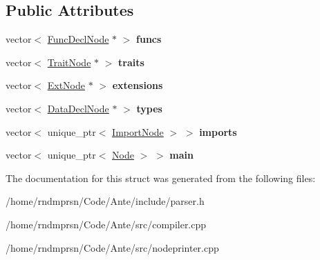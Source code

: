 \subsection*{Public Attributes}
\begin{DoxyCompactItemize}
\item 
\mbox{\label{structRootNode_a19febba060ea41f0c58644d57961dec1}} 
vector$<$ \hyperlink{structFuncDeclNode}{Func\+Decl\+Node} $\ast$ $>$ {\bfseries funcs}
\item 
\mbox{\label{structRootNode_a117ef77726fd5f3c3e4ead6abad58dc9}} 
vector$<$ \hyperlink{structTraitNode}{Trait\+Node} $\ast$ $>$ {\bfseries traits}
\item 
\mbox{\label{structRootNode_aabc83f42e419bcb09678aa661256b3e4}} 
vector$<$ \hyperlink{structExtNode}{Ext\+Node} $\ast$ $>$ {\bfseries extensions}
\item 
\mbox{\label{structRootNode_a4fec05675e4a7ecee8beabfb4801e2aa}} 
vector$<$ \hyperlink{structDataDeclNode}{Data\+Decl\+Node} $\ast$ $>$ {\bfseries types}
\item 
\mbox{\label{structRootNode_ab814cb1540c7ff388c0587f218b984b2}} 
vector$<$ unique\+\_\+ptr$<$ \hyperlink{structImportNode}{Import\+Node} $>$ $>$ {\bfseries imports}
\item 
\mbox{\label{structRootNode_afe384fca3477b96b61f6379733a96902}} 
vector$<$ unique\+\_\+ptr$<$ \hyperlink{structNode}{Node} $>$ $>$ {\bfseries main}
\end{DoxyCompactItemize}


The documentation for this struct was generated from the following files\+:\begin{DoxyCompactItemize}
\item 
/home/rndmprsn/\+Code/\+Ante/include/parser.\+h\item 
/home/rndmprsn/\+Code/\+Ante/src/compiler.\+cpp\item 
/home/rndmprsn/\+Code/\+Ante/src/nodeprinter.\+cpp\end{DoxyCompactItemize}
